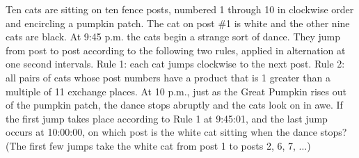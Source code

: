 Ten cats are sitting on ten fence posts, numbered 1 through 10 in clockwise
order and encircling a pumpkin patch. The cat on post \#1 is white and the
other nine cats are black. At 9:45 p.m. the cats begin a strange sort of dance.
They jump from post to post according to the following two rules, applied in
alternation at one second intervals. Rule 1: each cat jumps clockwise to the
next post. Rule 2: all pairs of cats whose post numbers have a product that is
1 greater than a multiple of 11 exchange places. At 10 p.m., just as the Great
Pumpkin rises out of the pumpkin patch, the dance stops abruptly and the cats
look on in awe. If the first jump takes place according to Rule 1 at 9:45:01,
and the last jump occurs at 10:00:00, on which post is the white cat sitting
when the dance stops? (The first few jumps take the white cat from post 1 to
posts 2, 6, 7, $\dots$)
